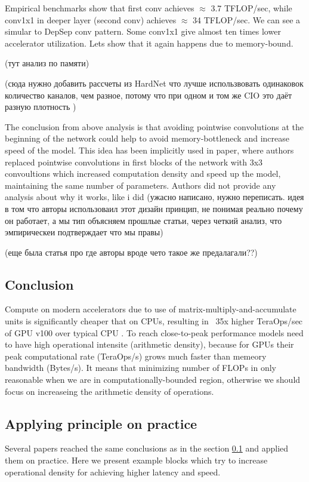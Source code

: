 Empirical benchmarks show that first conv achieves $\approx$ 3.7 TFLOP/sec, while conv1x1 in deeper layer (second conv) achieves $\approx$ 34 TFLOP/sec. We can see a simular to DepSep conv pattern. Some conv1x1 give almost ten times lower accelerator utilization. Lets show that it again happens due to memory-bound.

(тут анализ по памяти)

(сюда нужно добавить рассчеты из HardNet что лучше использвовать одинаковок количество каналов, чем разное, потому что при одном и том же CIO это даёт разную плотность )

The conclusion from above analysis is that avoiding pointwise convolutions at the beginning of the network could help to avoid memory-bottleneck and increase speed of the model. This idea has been implicitly used in \cite{ridnik2021_tresnet} paper, where authors replaced pointwise convolutions in first blocks of the network with 3x3 convoultions which increased computation density and speed up the model, maintaining the same number of parameters. Authors did not provide any analysis about why it works, like i did (ужасно написано, нужно переписать. идея в том что авторы использоваил этот дизайн принцип, не понимая реально почему он работает, а мы тип объясняем прошлые статьи, через четкий анализ, что эмпирическеи подтверждает что мы правы)


(еще была статья про \cite{zhou2020_rethinking} где авторы вроде чето такое же предалагали??)

\subsection{Conclusion} \label{subsec: speed_conclusion}

Compute on modern accelerators due to use of matrix-multiply-and-accumulate units is significantly cheaper that on CPUs, resulting in ~35x higher TeraOps/sec of GPU v100 over typical CPU \cite{li2021_searching}. To reach close-to-peak performance models need to have high operational intensite (arithmetic density), because for GPUs their peak computational rate (TeraOps/s) grows much faster than memeory bandwidth (Bytes/s). It means that minimizing number of FLOPs in only reasonable when we are in computationally-bounded region, otherwise we should focus on increaseing the arithmetic density of operations.  


\subsection{Applying principle on practice}
Several papers reached the same conclusions as in the section \ref{subsec: speed_conclusion} \cite{li2021_searching} \cite{lin2020neural_genet} and applied them on practice. Here we present example blocks which try to increase operational density for achieving higher latency and speed. 


